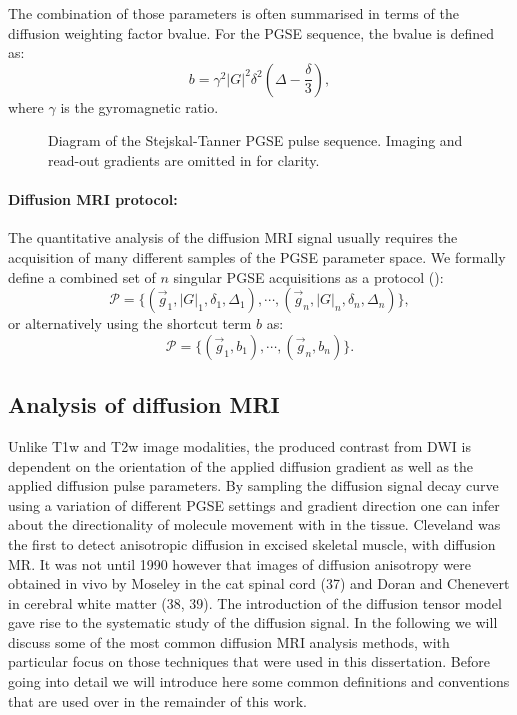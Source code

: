 The combination of those parameters is often summarised in terms of the diffusion weighting factor {\gls{bvalue}}. For the {\gls{PGSE}} sequence, the {\gls{bvalue}} is defined as:
\begin{equation}
	b = \gamma^2|G|^2\delta^2(\Delta-\frac{\delta}{3}),
    \label{eq:bvalue}
\end{equation}
where $\gamma$ is the gyromagnetic ratio.

\begin{figure}
 \centering
  \caption{Diagram of the Stejskal-Tanner {\protect\gls{PGSE}} pulse sequence. Imaging and read-out gradients are omitted in for clarity.}
  \label{fig:chapter 2 pgse_diagram}
\end{figure}

\paragraph{Diffusion MRI protocol: } The quantitative analysis of the diffusion MRI signal usually requires the acquisition of many different samples of the PGSE parameter space. We formally define a combined set of $n$ singular PGSE acquisitions as a protocol (\prot):
\begin{equation}
	\mathcal{P} = \{(\vec{g}_1,|G|_1,\delta_1,\Delta_1),\cdots,(\vec{g}_n,|G|_n,\delta_n,\Delta_n)\},
\end{equation}
or alternatively using the shortcut term $b$ as:
\begin{equation*}		
	\mathcal{P} = \{(\vec{g}_1,b_1),\cdots,(\vec{g}_n,b_n)\}.
\end{equation*} 


\subsection*{Analysis of diffusion MRI}
Unlike T1w and T2w image modalities, the produced contrast from DWI is dependent on the orientation of the applied diffusion gradient as well as the applied diffusion pulse parameters. By sampling the diffusion signal decay curve using a variation of different \gls{PGSE} settings and gradient direction one can infer about the directionality of molecule movement with in the tissue. Cleveland \citep{Cleveland:XXX} was the first to detect anisotropic diffusion in  excised skeletal muscle, with diffusion MR. It was not until 1990 however that images of diffusion anisotropy were obtained in vivo by Moseley in the cat spinal cord (37) and Doran and Chenevert in cerebral white matter (38, 39). The introduction of the diffusion tensor model gave rise to the systematic study of the diffusion signal. In the following we will discuss some of the most common diffusion MRI analysis methods, with particular focus on those techniques that were used in this dissertation. Before going into detail we will introduce here some common definitions and conventions that are used over in the remainder of this work. 


